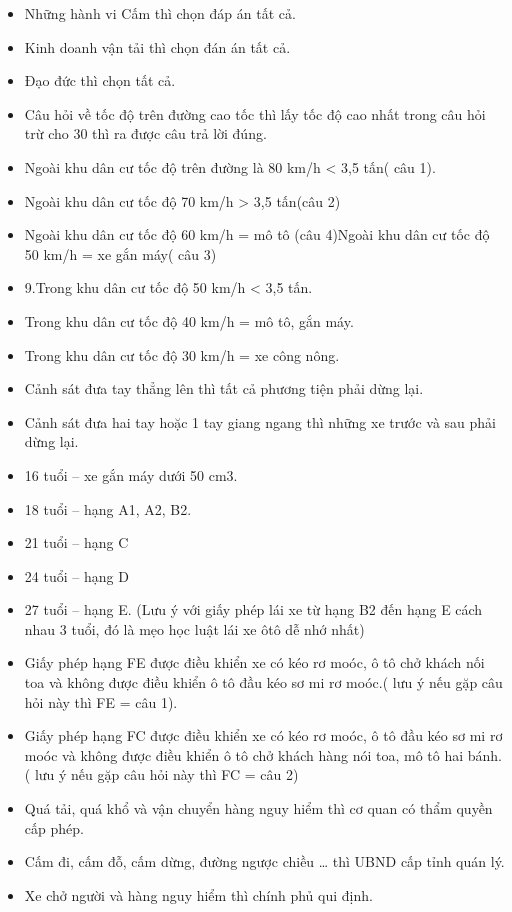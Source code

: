 \documentclass{article}
\begin{document}
\begin{itemize}
\item Những hành vi Cấm thì chọn đáp án tất cả.
\item     Kinh doanh vận tải thì chọn đán án tất cả.
\item     Đạo đức thì chọn tất cả.
\item     Câu hỏi về tốc độ trên đường cao tốc thì lấy tốc độ cao nhất trong câu hỏi trừ cho 30 thì ra được câu trả lời đúng.
\item     Ngoài khu dân cư tốc độ trên đường là 80 km/h < 3,5 tấn( câu 1).
\item     Ngoài khu dân cư tốc độ 70 km/h > 3,5 tấn(câu 2)
\item     Ngoài khu dân cư tốc độ 60 km/h = mô tô (câu 4)Ngoài khu dân cư tốc độ 50 km/h = xe gắn máy( câu 3)
\item     9.Trong khu dân cư tốc độ 50 km/h < 3,5 tấn.
\item     Trong khu dân cư tốc độ 40 km/h = mô tô, gắn máy.
\item     Trong khu dân cư tốc độ 30 km/h = xe công nông.
\item     Cảnh sát đưa tay thẳng lên thì tất cả phương tiện phải dừng lại.
\item     Cảnh sát đưa hai tay hoặc 1 tay giang ngang thì những xe trước và sau phải dừng lại.
\item     16 tuổi – xe gắn máy dưới 50 cm3.
\item     18 tuổi – hạng A1, A2, B2.
\item     21 tuổi – hạng C
\item     24 tuổi – hạng D
\item     27 tuổi – hạng E. (Lưu ý với giấy phép lái xe từ hạng B2 đến hạng E cách nhau 3 tuổi, đó là mẹo học luật lái xe ôtô dễ nhớ nhất)
\item     Giấy phép hạng FE được điều khiển xe có kéo rơ moóc, ô tô chở khách nối toa và không được điều khiển ô tô đầu kéo sơ mi rơ moóc.( lưu ý nếu gặp câu hỏi này thì FE = câu 1).
\item     Giấy phép hạng FC được điều khiển xe có kéo rơ moóc, ô tô đầu kéo sơ mi rơ moóc và không được điều khiển ô tô chở khách hàng nói toa, mô tô hai bánh.( lưu ý nếu gặp câu hỏi này thì FC = câu 2)
\item     Quá tải, quá khổ và vận chuyển hàng nguy hiểm thì cơ quan có thẩm quyền cấp phép.
\item     Cấm đi, cấm đỗ, cấm dừng, đường ngược chiều … thì UBND cấp tỉnh quán lý.
    \item Xe chở người và hàng nguy hiểm thì chính phủ qui định.

\end{itemize}
\end{document}
